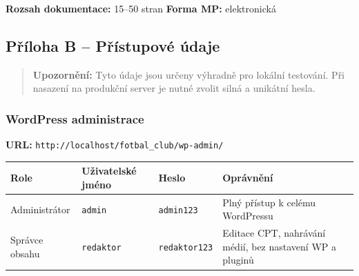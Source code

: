 \textbf{Rozsah dokumentace:} 15--50 stran \textbf{Forma MP:}
elektronická

\subsection{Příloha B -- Přístupové
údaje}\label{pux159uxedloha-b-pux159uxedstupovuxe9-uxfadaje}

\begin{quote}
\textbf{Upozornění:} Tyto údaje jsou určeny výhradně pro lokální
testování. Při nasazení na produkční server je nutné zvolit silná a
unikátní hesla.
\end{quote}

\subsubsection{WordPress administrace}\label{wordpress-administrace}

\textbf{URL:} \texttt{http://localhost/fotbal\_club/wp-admin/}

{\def\LTcaptype{none} %
\begin{longtable}[]{@{}
  >{\raggedright\arraybackslash}p{}
  >{\raggedright\arraybackslash}p{}
  >{\raggedright\arraybackslash}p{}
  >{\raggedright\arraybackslash}p{}@{}}
\toprule\noalign{}
\begin{minipage}[b]{\linewidth}\raggedright
Role
\end{minipage} & \begin{minipage}[b]{\linewidth}\raggedright
Uživatelské jméno
\end{minipage} & \begin{minipage}[b]{\linewidth}\raggedright
Heslo
\end{minipage} & \begin{minipage}[b]{\linewidth}\raggedright
Oprávnění
\end{minipage} \\
\midrule\noalign{}
\endhead
\bottomrule\noalign{}
\endlastfoot
Administrátor & \texttt{admin} & \texttt{admin123} & Plný přístup k
celému WordPressu \\
Správce obsahu & \texttt{redaktor} & \texttt{redaktor123} & Editace CPT,
nahrávání médií, bez nastavení WP a pluginů \\
\end{longtable}
}

